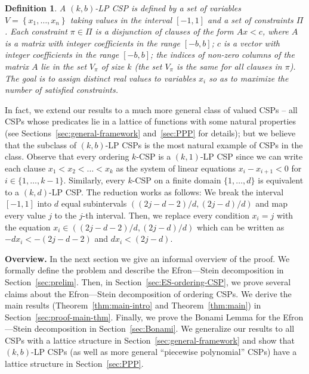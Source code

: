 \documentclass[11pt]{article}
\newcommand {\set}   [1] {\left\{ #1 \right\}}
\newtheorem{definition}[theorem]{Definition}
\begin{document}
\begin{definition}\label{def:LP-CSP}
A $(k,b)$-LP CSP is defined by a set of variables $V = \set{x_1,\dots, x_n}$ taking values in the interval $[-1,1]$
and a set of constraints $\Pi$. Each constraint $\pi\in \Pi$ is a disjunction of clauses of the form
$Ax < c$, where $A$ is a matrix with integer coefficients in the range $[-b,b]$;
$c$ is a vector with integer coefficients in the range $[-b,b]$; the indices of  non-zero columns of the matrix
$A$ lie in the set $V_{\pi}$ of size $k$ (the set $V_{\pi}$ is the same for all clauses in $\pi$).
The goal is to assign distinct real values to variables $x_i$ so as to maximize the number of satisfied constraints.
\end{definition}

In fact, we extend our results to a much more general class of valued CSPs -- all CSPs whose
predicates lie in a lattice of functions with some natural properties
(see Sections~\ref{sec:general-framework} and~\ref{sec:PPP}  for details);
but we believe that the subclass of $(k,b)$-LP CSPs is the most natural example of CSPs in the class.
Observe that every ordering $k$-CSP is a $(k,1)$-LP CSP since we can
write each clause $x_1< x_2< \dots < x_k$ as the system of linear equations
$x_i - x_{i+1} < 0$ for $i\in \{1,\dots,k-1\}$. Similarly, every $k$-CSP on
a finite domain $\{1,\dots, d\}$ is equivalent to a $(k,d)$-LP CSP. The reduction works as follows:
We break the interval $[-1,1]$ into $d$ equal subintervals $((2j-d - 2)/d, (2j-d)/d )$
and map every value $j$ to the $j$-th interval. Then, we replace every
condition $x_i = j$ with the equation $x_i \in ((2j-d-2)/d, (2j-d)/d)$
which can be written as $-d x_i < -(2j-d-2)$ and $d x_i < (2j-d)$.


\medskip

\noindent \textbf{Overview.} In the next section we give an informal overview of the proof.
We formally define the problem and describe the Efron---Stein decomposition in Section~\ref{sec:prelim}.
Then, in Section~\ref{sec:ES-ordering-CSP}, we prove several claims about the Efron---Stein decomposition
of ordering CSPs. We derive the main results (Theorem~\ref{thm:main-intro} and Theorem~\ref{thm:main}) in
Section~\ref{sec:proof-main-thm}. Finally, we prove the Bonami Lemma for the Efron---Stein decomposition
in Section~\ref{sec:Bonami}. We generalize our results to all CSPs with a lattice structure in Section~\ref{sec:general-framework}
and show that $(k,b)$-LP CSPs (as well as more general ``piecewise polynomial'' CSPs)
have a lattice structure in Section~\ref{sec:PPP}.
\end{document}

